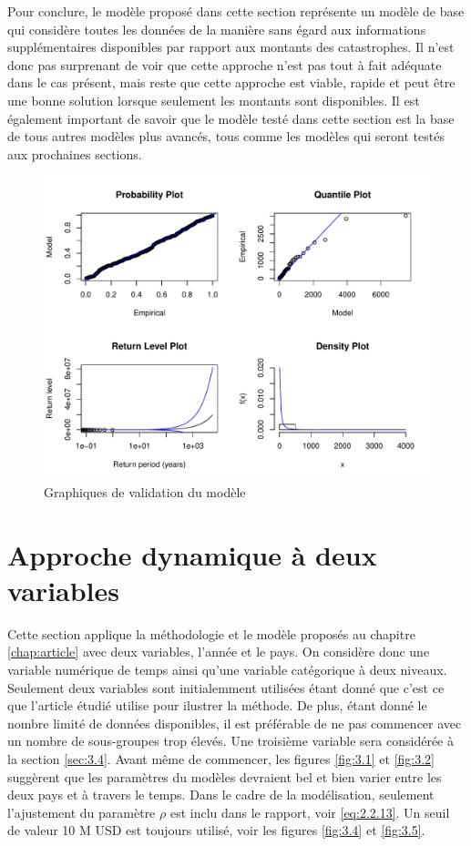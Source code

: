 Pour conclure, le modèle proposé dans cette section représente un modèle de base qui considère toutes les données de la manière sans égard aux informations supplémentaires disponibles par rapport aux montants des catastrophes. Il n'est donc pas surprenant de voir que cette approche n'est pas tout à fait adéquate dans le cas présent, mais reste que cette approche est viable, rapide et peut être une bonne solution lorsque seulement les montants sont disponibles. Il est également important de savoir que le modèle testé dans cette section est la base de tous autres modèles plus avancés, tous comme les modèles qui seront testés aux prochaines sections.
\begin{figure}[h]
\begin{center}
\includegraphics{images/fig-011}
\end{center}
\caption{Graphiques de validation du modèle}
\label{fig:3.6}
\end{figure}


\clearpage
\section{Approche dynamique à deux variables}
\label{sec:3.3}

Cette section applique la méthodologie et le modèle proposés au chapitre \ref{chap:article} avec deux variables, l'année et le pays. On considère donc une variable numérique de temps ainsi qu'une variable catégorique à deux niveaux. Seulement deux variables sont initialemment utilisées étant donné que c'est ce que l'article étudié utilise pour ilustrer la méthode. De plus, étant donné le nombre limité de données disponibles, il est préférable de ne pas commencer avec un nombre de sous-groupes trop élevés. Une troisième variable sera considérée à la section \ref{sec:3.4}. Avant même de commencer, les figures \ref{fig:3.1} et \ref{fig:3.2} suggèrent que les paramètres du modèles devraient bel et bien varier entre les deux pays et à travers le temps. Dans le cadre de la modélisation, seulement l'ajustement du paramètre $\rho$ est inclu dans le rapport, voir \ref{eq:2.2.13}. Un seuil de valeur 10 M USD est toujours utilisé, voir les figures \ref{fig:3.4} et \ref{fig:3.5}. 
\\

